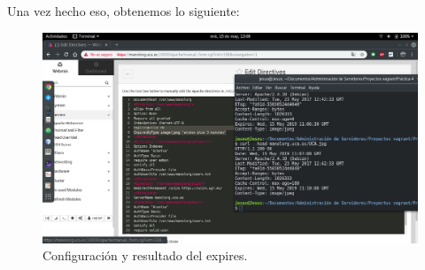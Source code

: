 \documentclass[12pt,letterpaper]{article}
\begin{document}
\newpage
Una vez hecho eso, obtenemos lo siguiente:
\begin{figure}[h]
	\centering
	\includegraphics[scale=0.34]{Expires.png}
	\caption{Configuración y resultado del expires.}
	\label{Configuración y resultado del expires}
\end{figure}
\end{document}
